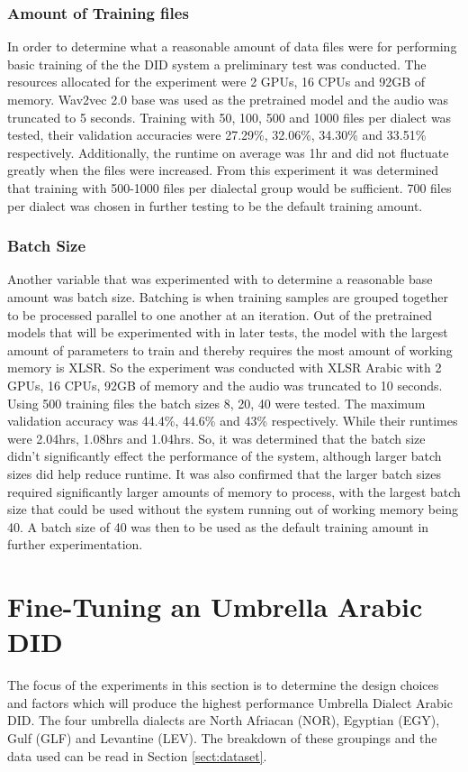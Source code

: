 \subsubsection*{Amount of Training files}
In order to determine what a reasonable amount of data files were for performing basic training of the 
the DID system a preliminary test was conducted. The resources allocated for the experiment were 2 GPUs, 16 CPUs and 92GB of memory. 
Wav2vec 2.0 base was used as the pretrained model and the audio was truncated to 5 seconds. Training with 
50, 100, 500 and 1000 files per dialect was tested, their validation accuracies were 27.29\%, 32.06\%, 34.30\% and 33.51\% respectively. Additionally, 
the runtime on average was 1hr and did not fluctuate greatly when the files were increased. From this experiment it was determined that training with 500-1000 files per dialectal group 
would be sufficient. 700 files per dialect was chosen in further testing to be the default training amount. 
\subsubsection*{Batch Size}
Another variable that was experimented with to determine a reasonable base amount was batch size. Batching is when training samples are grouped together to be processed parallel to one another 
at an iteration. Out of the pretrained models that will be experimented with in later tests, the model with the largest amount of parameters to train and thereby requires the most amount of working memory is 
XLSR. So the experiment was conducted with XLSR Arabic with 2 GPUs, 16 CPUs, 92GB of memory and the audio was truncated to 10 seconds. 
Using 500 training files the batch sizes 8, 20, 40 were tested. The maximum validation accuracy was 44.4\%, 44.6\% and 43\% respectively. While their runtimes were 2.04hrs, 1.08hrs and 1.04hrs.
So, it was determined that the batch size didn't significantly effect the performance of the system, although larger batch sizes did help reduce runtime. It was also confirmed that the larger batch sizes required significantly larger amounts of memory to process, 
with the largest batch size that could be used without the system running out of working memory being 40. A batch size of 40 was then to be used as the default training amount in further experimentation. 
\section{Fine-Tuning an Umbrella Arabic DID}\label{sect:finetuneUmbDID}
The focus of the experiments in this section is to determine the design choices and factors 
which will produce the highest performance Umbrella Dialect Arabic DID. The four umbrella dialects are North Afriacan (NOR), Egyptian (EGY), 
Gulf (GLF) and Levantine (LEV). The breakdown of these groupings and the data used can be read in Section \ref{sect:dataset}. 
